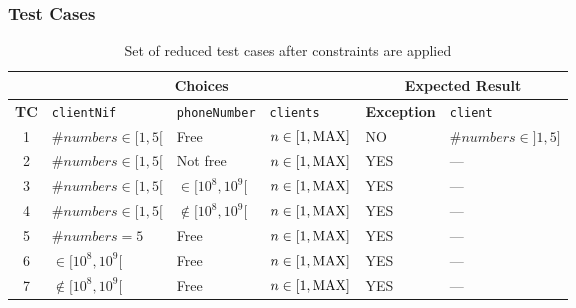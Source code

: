 \subsubsection{Test Cases}
\label{sec:methods.assignPhoneNumber.tests}
\begin{table}[!hbtp]
  \centering
  \normalsize
  \begin{tabular}{|c|*{5}{l|}}
    \cline{2-6}
    \multicolumn{1}{c|}{}
      & \multicolumn{3}{c|}{\textbf{Choices}}
      & \multicolumn{2}{c|}{\textbf{Expected Result}} \\
    \hline
    \textbf{TC}
      & \texttt{clientNif} & \texttt{phoneNumber} & \texttt{clients}
      & \textbf{Exception} & \texttt{client} \\
    \hline
    1 & $\#numbers \in [1,5[$ & Free & $n \in [1,\rm{MAX}]$
      & NO & $\#numbers \in ]1,5]$ \\ \hline
    2 & $\#numbers \in [1,5[$ & Not free & $n \in [1,\rm{MAX}]$
      & YES & --- \\ \hline
    3 & $\#numbers \in [1,5[$ & $\in [10^8,10^9[$ & $n \in [1,\rm{MAX}]$
      & YES & --- \\ \hline
    4 & $\#numbers \in [1,5[$ & $\notin [10^8,10^9[$ & $n \in [1,\rm{MAX}]$
      & YES & --- \\ \hline
    5 & $\#numbers = 5$ & Free & $n \in [1,\rm{MAX}]$
      & YES & --- \\ \hline
    6 & $\in [10^8,10^9[$ & Free & $n \in [1,\rm{MAX}]$
      & YES & --- \\ \hline
    7 & $\notin [10^8,10^9[$ & Free & $n \in [1,\rm{MAX}]$
      & YES & --- \\ \hline
  \end{tabular}
  \caption{Set of reduced test cases after constraints are applied}
  \label{tab:methods.assignPhoneNumber.tests}
\end{table}